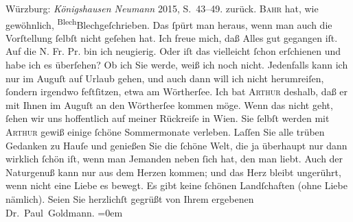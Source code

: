 \begin{ledgroupsized}[t]{13cm}
{{{                     Würzburg: \emph{Königshausen {\kaufmannsund} Neumann}{ }2015, S. 43–49.}}}\label{K_L03527-2h} zurück. \textsc{Bahr} hat, {\pb}wie gewöhnlich, \substVorne{}\textsuperscript{Blech}\substDazwischen{}Blech\substHinten{}{ }geſchrieben. Das ſpürt man
               heraus, wenn man auch die Vorſtellung ſelbſt nicht geſehen hat. Ich freue mich, daß Alles gut gegangen
               iſt. Auf die N. Fr. Pr. bin ich neugierig. Oder
               iſt das \label{K_L03527-3v}\label{K_L03527-3h} vielleicht ſchon erſchienen und habe
               ich es überſehen?\pend
           \pstart
           Ob ich Sie \label{K_L03527-4v}\label{K_L03527-4h} werde, weiß ich noch nicht. Jedenfalls kann ich nur im Auguſt auf Urlaub gehen, {\pb}und auch dann
               will ich nicht herumreiſen, ſondern irgendwo feſtſitzen, etwa am Wörtherſee. Ich bat \textsc{Arthur}{ } deshalb, daß er mit Ihnen im Auguſt an den Wörtherſee
               kommen möge. Wenn das nicht geht, ſehen wir uns hoffentlich auf meiner Rückreiſe in
                  Wien.\pend
           \pstart
           Sie ſelbſt werden mit \textsc{Arthur} gewiß einige ſchöne {\pb}Sommermonate verleben.
               Laſſen Sie alle trüben Gedanken zu Hauſe und genießen Sie die ſchöne Welt, die ja
               überhaupt nur dann wirklich ſchön iſt, wenn man Jemanden neben ſich hat, den man  liebt. Auch der Naturgenuß kann nur aus dem Herzen
               kommen; und das Herz bleibt ungerührt, wenn nicht eine Liebe es bewegt. Es gibt keine
               ſchönen Landſchaften (ohne Liebe nämlich).\pend
           \pstart
           Seien Sie herzlichſt gegrüßt von Ihrem ergebenen {\\[\baselineskip]}\spacefill\mbox{Dr. Paul Goldmann.}\pend
           \leftskip=0em{}
         

\end{ledgroupsized}
